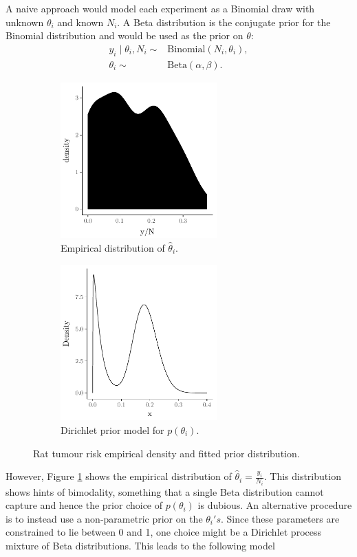 \documentclass[nojss]{jss}
\begin{document}
A naive approach would model each experiment as a Binomial draw with unknown $\theta _i$ and known $N_i$. A Beta distribution is the conjugate prior for the Binomial distribution and would be used as the prior on $\theta$:
\begin{align*}
y_i \mid \theta_i, N_i \sim & \text{Binomial}(N_i,\theta_i), \\
\theta_i \sim & \text{Beta}(\alpha, \beta).
\end{align*}

\begin{figure}[tb]
\begin{subfigure}[b]{0.5\textwidth}
	\centering
	\includegraphics[height=60mm, width=60mm]{img/ratsImpericalDistribution.pdf}
	\caption{Empirical distribution of $\hat{\theta}_i$.}
	\label{fig:ratsImperical}
\end{subfigure}
\begin{subfigure}[b]{0.5\textwidth}
	\centering
	\includegraphics[height=60mm, width=60mm]{img/ratsDirichletPrior.pdf}
	\caption{Dirichlet prior model for $p(\theta _i)$.}
	\label{fig:rats_dirichlet_model}
\end{subfigure}
\caption{Rat tumour risk empirical density and fitted prior distribution.}
\end{figure}

However, Figure \ref{fig:ratsImperical} shows the empirical distribution of $\hat{\theta}_i = \frac{y_i}{N_i}$. This distribution shows hints of bimodality, something that a single Beta distribution cannot capture and hence the prior choice of $p(\theta_i)$ is dubious.
An alternative procedure is to instead use a non-parametric prior on the $\theta_i's$. Since these parameters are constrained to lie between 0 and 1, one choice might be a Dirichlet process mixture of Beta distributions. This leads to the following model
\end{document}

